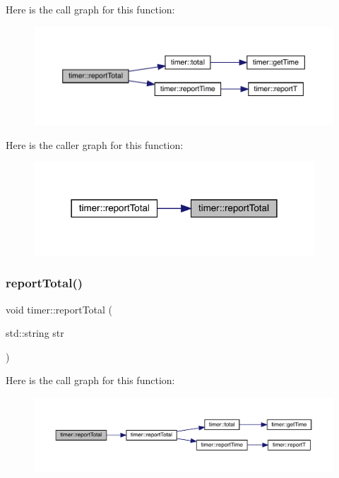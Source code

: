 Here is the call graph for this function\+:\nopagebreak
\begin{figure}[H]
\begin{center}
\leavevmode
\includegraphics[width=350pt]{structtimer_a94d8ef06e519bc2daad6a2871769dcc6_cgraph}
\end{center}
\end{figure}
Here is the caller graph for this function\+:\nopagebreak
\begin{figure}[H]
\begin{center}
\leavevmode
\includegraphics[width=298pt]{structtimer_a94d8ef06e519bc2daad6a2871769dcc6_icgraph}
\end{center}
\end{figure}
\mbox{\label{structtimer_a2ca02959907cfd5a411d88460531cec3}} 
\subsubsection{\texorpdfstring{reportTotal()}{reportTotal()}\hspace{0.1cm}{\footnotesize\ttfamily [2/2]}}
{\footnotesize\ttfamily void timer\+::report\+Total (\begin{DoxyParamCaption}\item[{std\+::string}]{str }\end{DoxyParamCaption})\hspace{0.3cm}{\ttfamily [inline]}}

Here is the call graph for this function\+:\nopagebreak
\begin{figure}[H]
\begin{center}
\leavevmode
\includegraphics[width=350pt]{structtimer_a2ca02959907cfd5a411d88460531cec3_cgraph}
\end{center}
\end{figure}
\mbox{\label{structtimer_a9aa894a57748b2bdf3adce46f5736794}} 
